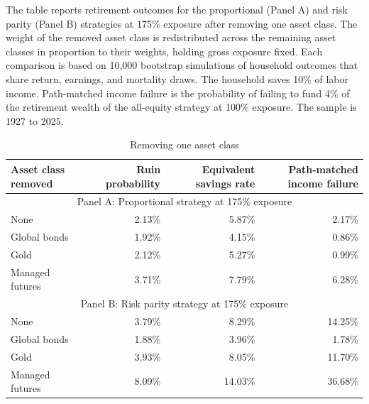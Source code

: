 \begin{table}[p]\centering
\caption{Removing one asset class}\label{tab:ablations}
\begin{minipage}{\linewidth}\small The table reports retirement outcomes for the proportional (Panel A) and risk parity (Panel B) strategies at 175\% exposure after removing one asset class. The weight of the removed asset class is redistributed across the remaining asset classes in proportion to their weights, holding gross exposure fixed. Each comparison is based on 10,000 bootstrap simulations of household outcomes that share return, earnings, and mortality draws. The household saves 10\% of labor income. Path-matched income failure is the probability of failing to fund 4\% of the retirement wealth of the all-equity strategy at 100\% exposure. The sample is 1927 to 2025.\end{minipage}
\medskip

{\small\setlength{\tabcolsep}{4pt}\begin{tabular}{lrrr}\toprule
Asset class removed & Ruin probability & Equivalent savings rate & Path-matched income failure \\ \midrule
\multicolumn{4}{c}{Panel A: Proportional strategy at 175\% exposure} \\
None & 2.13\% & 5.87\% & 2.17\% \\
Global bonds & 1.92\% & 4.15\% & 0.86\% \\
Gold & 2.12\% & 5.27\% & 0.99\% \\
Managed futures & 3.71\% & 7.79\% & 6.28\% \\
\multicolumn{4}{c}{Panel B: Risk parity strategy at 175\% exposure} \\
None & 3.79\% & 8.29\% & 14.25\% \\
Global bonds & 1.88\% & 3.96\% & 1.78\% \\
Gold & 3.93\% & 8.05\% & 11.70\% \\
Managed futures & 8.09\% & 14.03\% & 36.68\% \\
\bottomrule\end{tabular}}
\end{table}
